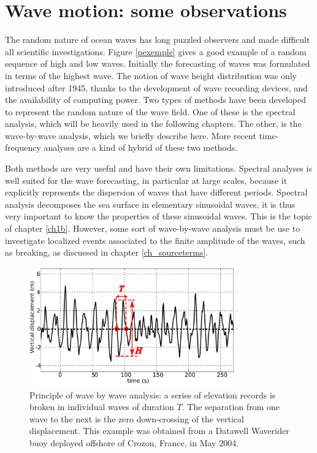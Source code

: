 \section{Wave motion: some observations}
The random nature of ocean waves has long puzzled observers and made difficult all scientific investigations. 
Figure \ref{pexemple} gives a good example of a random sequence of high and low waves. Initially  
the forecasting of waves was formulated in terms of the highest wave. The notion of wave height distribution was only introduced after 1945, 
thanks to the development of wave recording devices, and the availability of computing power. Two types of methods have been developed to 
represent the random nature of the wave field. 
One of these is the spectral analysis, which will be heavily used in the following chapters. The other, is the wave-by-wave analysis, 
which we briefly describe here. More recent time-frequency analyses are a kind of hybrid of these two methods. 


Both methods are very useful and have their own limitations. Spectral analyses is well suited for the wave forecasting, in 
particular at large scales, because it explicitly represents the dispersion of waves that have different periods. 
Spectral analysis decomposes the sea surface in elementary sinusoidal waves, it is thus very important to know the properties of these 
sinusoidal waves. This is the topic of chapter \ref{ch1b}.
However, some sort of wave-by-wave analysis must be use to investigate localized 
events associated to the finite amplitude of the waves, such as breaking, as discussed in chapter \ref{ch_sourceterms}. 

\begin{figure} \label{FigWaveriderTSz}
\centerline{\includegraphics[width=0.8\textwidth]{FIGS_CH_INTRO/Exemple_DWIROISE2004_en.pdf}}
  \caption{Principle of wave by wave analysis: a series of elevation records is broken in individual waves of duration $T$. The separation from one 
wave to the next is the zero down-crossing of the vertical displacement. This example was obtained from a Datawell Waverider buoy deployed offshore 
of Crozon, France, in May 2004.}\label{fig:zero_crossing}
\end{figure}


